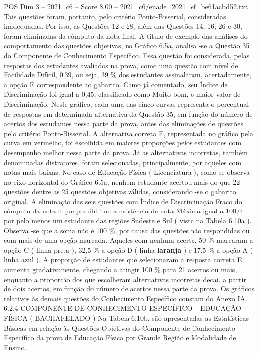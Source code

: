 \begin{textsample}{POS Dim 3 – 2021\_c6 – Score 8.00 – 2021\_c6/enade\_2021\_ef\_be61acbd52.txt}
Tais questões foram, portanto, pelo critério Ponto-Bisserial, consideradas inadequadas.
Por isso, as Questões 12 e 28, além das Questões 14, 16, 26 e 30, foram eliminadas do cômputo da nota final.
A título de exemplo das análises do comportamento das questões objetivas, no Gráfico 6.5a, analisa -se a Questão 35 do Componente de Conhecimento Específico.
Essa questão foi considerada, pelas respostas dos estudantes avaliados na prova, como uma questão com nível de Facilidade Difícil, 0,39, ou seja, 39 \% dos estudantes assinalaram, acertadamente, a opção E correspondente ao gabarito.
Como já comentado, seu Índice de Discriminação foi igual a 0,45, classificado como Muito bom, o maior valor de Discriminação.
Neste gráfico, cada uma das cinco curvas representa o percentual de respostas em determinada alternativa da Questão 35, em função do número de acertos dos estudantes nessa parte da prova, antes das eliminações de questões pelo critério Ponto-Bisserial.
A alternativa correta E, representada no gráfico pela curva em vermelho, foi escolhida em maiores proporções pelos estudantes com desempenho melhor nessa parte da prova.
Já as alternativas incorretas, também denominadas distratores, foram selecionadas, principalmente, por aqueles com notas mais baixas.
No caso de Educação Física ( Licenciatura ), como se observa no eixo horizontal do Gráfico 6.5a, nenhum estudante acertou mais do que 22 questões dentre as 25 questões objetivas válidas, considerando -se o gabarito original.
A eliminação das seis questões com Índice de Discriminação Fraco do cômputo da nota é que possibilitou a existência de nota Máxima igual a 100,0 por pelo menos um estudante das regiões Sudeste e Sul ( visto na Tabela 6.10a ).
Observa -se que a soma não é 100 \%, por causa das questões não respondidas ou com mais de uma opção marcada.
Aqueles com nenhum acerto, 50 \% marcaram a opção C ( linha preta ), 32,5 \% a opção D ( linha \textbf{laranja} ) e 17,5 \% a opção A ( linha azul ).
A proporção de estudantes que selecionaram a resposta correta E aumenta gradativamente, chegando a atingir 100 \% para 21 acertos ou mais, enquanto a proporção dos que escolheram alternativas incorretas decai, a partir de dois acertos, em função do número de acertos nessa parte da prova.
Os gráficos relativos às demais questões do Conhecimento Específico constam do Anexo IA. 6.2.4 COMPONENTE DE CONHECIMENTO ESPECÍFICO – EDUCAÇÃO FÍSICA ( BACHARELADO ) Na Tabela 6.10b, são apresentadas as Estatísticas Básicas em relação às Questões Objetivas do Componente de Conhecimento Específico da prova de Educação Física por Grande Região e Modalidade de Ensino.

\end{textsample}
